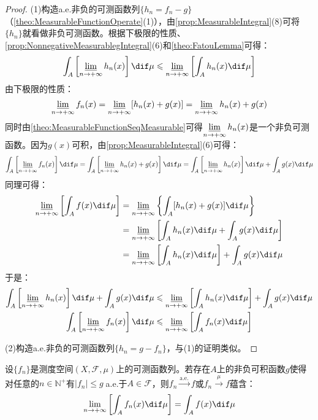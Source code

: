 \begin{proof}
	(1)构造a.e.非负的可测函数列$\{h_n=f_n-g\}$（\cref{theo:MeasurableFunctionOperate}(1)），由\cref{prop:MeasurableIntegral}(8)可将$\{h_n\}$就看做非负可测函数。根据下极限的性质、\cref{prop:NonnegativeMeasurablegIntegral}(6)和\cref{theo:FatouLemma}可得：
	\begin{equation*}
		\int_{A}\left[\varliminf_{n\to+\infty}h_n(x)\right]\dif\mu\leqslant\varliminf_{n\to+\infty}\left[\int_{A}h_n(x)\dif\mu\right]
	\end{equation*}
	由下极限的性质：
	\begin{equation*}
		\varliminf_{n\to+\infty}f_n(x)=\varliminf_{n\to+\infty}[h_n(x)+g(x)]=\varliminf_{n\to+\infty}h_n(x)+g(x)
	\end{equation*}
	同时由\cref{theo:MeasurableFunctionSeqMeasurable}可得$\varliminf\limits_{n\to+\infty}h_n(x)$是一个非负可测函数。因为$g(x)$可积，由\cref{prop:MeasurableIntegral}(6)可得：
	\begin{equation*}
		\int_{A}\left[\varliminf_{n\to+\infty}f_n(x)\right]\dif\mu=\int_{A}\left[\varliminf_{n\to+\infty}h_n(x)+g(x)\right]\dif\mu=\int_{A}\left[\varliminf_{n\to+\infty}h_n(x)\right]\dif\mu+\int_{A}g(x)\dif\mu
	\end{equation*}
	同理可得：
	\begin{align*}
		\varliminf_{n\to+\infty}\left[\int_{A}f(x)\dif\mu\right]&=\varliminf_{n\to+\infty}\left\{\int_{A}[h_n(x)+g(x)]\dif\mu\right\} \\
		&=\varliminf_{n\to+\infty}\left[\int_{A}h_n(x)\dif\mu+\int_{A}g(x)\dif\mu\right] \\
		&=\varliminf_{n\to+\infty}\left[\int_{A}h_n(x)\dif\mu\right]+\int_{A}g(x)\dif\mu
	\end{align*}
	于是：
	\begin{gather*}
		\int_{A}\left[\varliminf_{n\to+\infty}h_n(x)\right]\dif\mu+\int_{A}g(x)\dif\mu\leqslant\varliminf_{n\to+\infty}\left[\int_{A}h_n(x)\dif\mu\right]+\int_{A}g(x)\dif\mu \\
		\int_{A}\left[\varliminf_{n\to+\infty}f_n(x)\right]\dif\mu\leqslant\varliminf_{n\to+\infty}\left[\int_{A}f_n(x)\dif\mu\right]
	\end{gather*}\par
	(2)构造a.e.非负的可测函数列$\{h_n=g-f_n\}$，与(1)的证明类似。
\end{proof}
\begin{theorem}[Lebesgue控制收敛定理]\label{theo:DominatedConvergenceTheorem}
	设$\{f_n\}$是测度空间$(X,\mathscr{F},\mu)$上的可测函数列。若存在$A$上的非负可积函数$g$使得对任意的$n\in\mathbb{N}^+$有$|f_n|\leqslant g\;$a.e.于$A\in\mathscr{F}$，则$f_n\overset{\text{a.e.}}{\longrightarrow}f$或$f_n\overset{\mu}{\longrightarrow}f$蕴含：
	\begin{equation*}
		\lim_{n\to+\infty}\left[\int_{A}f_n(x)\dif\mu\right]=\int_{A}f(x)\dif\mu
	\end{equation*}
\end{theorem}
